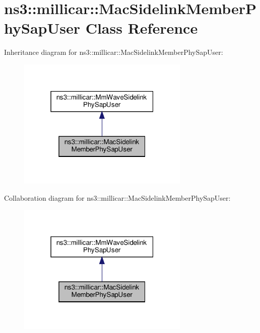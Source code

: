 \hypertarget{classns3_1_1millicar_1_1MacSidelinkMemberPhySapUser}{}\section{ns3\+:\+:millicar\+:\+:Mac\+Sidelink\+Member\+Phy\+Sap\+User Class Reference}
\label{classns3_1_1millicar_1_1MacSidelinkMemberPhySapUser}


Inheritance diagram for ns3\+:\+:millicar\+:\+:Mac\+Sidelink\+Member\+Phy\+Sap\+User\+:\nopagebreak
\begin{figure}[H]
\begin{center}
\leavevmode
\includegraphics[width=232pt]{classns3_1_1millicar_1_1MacSidelinkMemberPhySapUser__inherit__graph}
\end{center}
\end{figure}


Collaboration diagram for ns3\+:\+:millicar\+:\+:Mac\+Sidelink\+Member\+Phy\+Sap\+User\+:\nopagebreak
\begin{figure}[H]
\begin{center}
\leavevmode
\includegraphics[width=232pt]{classns3_1_1millicar_1_1MacSidelinkMemberPhySapUser__coll__graph}
\end{center}
\end{figure}
